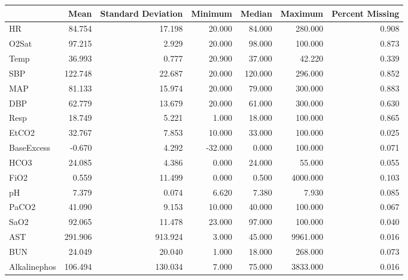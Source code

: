 \begin{table}
\centering
\label{tab_describe}
\begin{tabular}{lrrrrrr}
\toprule
{} &    Mean & Standard Deviation &   Minimum &  Median &  Maximum & Percent Missing \\
\midrule
HR               &  84.754 &             17.198 &    20.000 &  84.000 &  280.000 &           0.908 \\
O2Sat            &  97.215 &              2.929 &    20.000 &  98.000 &  100.000 &           0.873 \\
Temp             &  36.993 &              0.777 &    20.900 &  37.000 &   42.220 &           0.339 \\
SBP              & 122.748 &             22.687 &    20.000 & 120.000 &  296.000 &           0.852 \\
MAP              &  81.133 &             15.974 &    20.000 &  79.000 &  300.000 &           0.883 \\
DBP              &  62.779 &             13.679 &    20.000 &  61.000 &  300.000 &           0.630 \\
Resp             &  18.749 &              5.221 &     1.000 &  18.000 &  100.000 &           0.865 \\
EtCO2            &  32.767 &              7.853 &    10.000 &  33.000 &  100.000 &           0.025 \\
BaseExcess       &  -0.670 &              4.292 &   -32.000 &   0.000 &  100.000 &           0.071 \\
HCO3             &  24.085 &              4.386 &     0.000 &  24.000 &   55.000 &           0.055 \\
FiO2             &   0.559 &             11.499 &     0.000 &   0.500 & 4000.000 &           0.103 \\
pH               &   7.379 &              0.074 &     6.620 &   7.380 &    7.930 &           0.085 \\
PaCO2            &  41.090 &              9.153 &    10.000 &  40.000 &  100.000 &           0.067 \\
SaO2             &  92.065 &             11.478 &    23.000 &  97.000 &  100.000 &           0.040 \\
AST              & 291.906 &            913.924 &     3.000 &  45.000 & 9961.000 &           0.016 \\
BUN              &  24.049 &             20.040 &     1.000 &  18.000 &  268.000 &           0.073 \\
Alkalinephos     & 106.494 &            130.034 &     7.000 &  75.000 & 3833.000 &           0.016 \\

\end{tabular}
\end{table}
